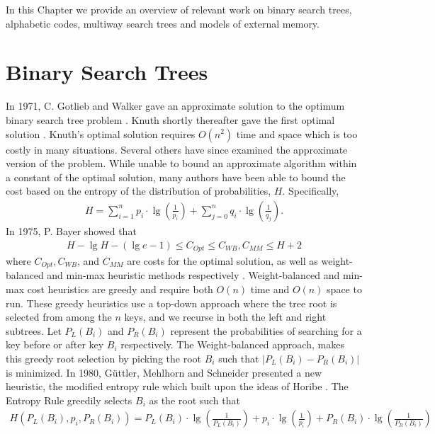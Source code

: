 \documentclass[letterpaper,12pt,titlepage,oneside,final]{book}
\theoremstyle{plain}
\begin{document}
In this Chapter we provide an overview of relevant work on binary search trees, alphabetic codes, multiway search trees and models of external memory.

\section{Binary Search Trees}

In 1971, C. Gotlieb and Walker gave an approximate solution to the optimum binary search tree problem \cite{walker1971top}. Knuth shortly thereafter gave the first optimal solution \cite{knuth1971optimum}. Knuth's optimal solution requires $O(n^2)$ time and space which is too costly in many situations. Several others have since examined the approximate version of the problem. While unable to bound an approximate algorithm within a constant of the optimal solution, many authors have been able to bound the cost based on the entropy of the distribution of probabilities, $H$. Specifically, 
\begin{align*}
H = \sum_{i=1}^{n} p_i\cdot\lg(\frac{1}{p_i}) + \sum_{j=0}^{n} q_i\cdot\lg(\frac{1}{q_j}).
\end{align*}
In 1975, P. Bayer showed that 
\begin{align*}
H-\lg H-(\lg e-1) \leq C_{Opt} \leq C_{WB}, C_{MM} \leq H + 2
\end{align*}
where $C_{Opt}, C_{WB}$, and $C_{MM}$ are costs for the optimal solution, as well as weight-balanced and min-max heuristic methods respectively \cite{bayer1975improved}. Weight-balanced and min-max cost heuristics are greedy and require both $O(n)$ time and $O(n)$ space to run. These greedy heuristics use a top-down approach where the tree root is selected from among the $n$ keys, and we recurse in both the left and right subtrees. Let $P_L(B_i)$ and $P_R(B_i)$ represent the probabilities of searching for a key before or after key $B_i$ respectively. The Weight-balanced approach, makes this greedy root selection by picking the root $B_i$ such that $|P_L(B_i)-P_R(B_i)|$ is minimized.
  In 1980, G{\"u}ttler, Mehlhorn and Schneider presented a new heuristic, the modified entropy rule \cite{guttler1980binary} which built upon the ideas of Horibe \cite{horibe1977improved}. The Entropy Rule greedily selects $B_i$ as the root such that
\begin{align*}
H(P_L(B_i), p_i, P_R(B_i)) = P_L(B_i)\cdot\lg(\frac{1}{P_L(B_i)}) + p_i \cdot \lg(\frac{1}{p_i}) + P_R(B_i)\cdot\lg(\frac{1}{P_R(B_i)})  
\end{align*}
\end{document}
